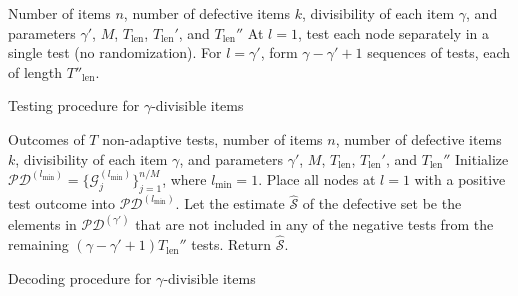 \begin{algorithm}[!t]
    \begin{algorithmic}[1]
        \REQUIRE Number of items $n$, number of defective items $k$, divisibility of each item $\gamma$, and parameters $\gamma'$, $M$, $T_{\text{len}}$, $T_{\text{len}}'$, and $T_{\text{len}}''$
        \STATE At $l=1$, test each node separately in a single test (no randomization).
        \ENDFOR
        \STATE For $l=\gamma'$, form $\gamma-\gamma'+1$ sequences of tests, each of length $T''_{\text{len}}$.
        \ENDFOR
    \end{algorithmic}
    \caption{Testing procedure for $\gamma$-divisible items \label{alg:gamma_nonadap_testing}}
\end{algorithm}

\begin{algorithm}[!t]
    \begin{algorithmic}[1]
        \REQUIRE Outcomes of $T$ non-adaptive tests, number of items $n$, number of defective items $k$, divisibility of each item $\gamma$, and parameters $\gamma'$, $M$, $T_{\text{len}}$, $T_{\text{len}}'$, and $T_{\text{len}}''$
        \STATE Initialize $\mathcal{PD}^{(l_{\text{min}})}=\big\{\mathcal{G}_j^{(l_{\text{min}})}\big\}_{j=1}^{n/M}$, where $l_{\text{min}}=1$.
        \STATE Place all nodes at $l=1$ with a positive test outcome into $\mathcal{PD}^{(l_{\text{min}})}$.
        \ENDFOR
        \STATE Let the estimate $\widehat{\mathcal{S}}$ of the defective set be the elements in $\mathcal{PD}^{(\gamma')}$ that are not included in any of the negative tests from the remaining $(\gamma-\gamma'+1)T_{\text{len}}''$ tests.
        \STATE Return $\widehat{\mathcal{S}}$.
    \end{algorithmic}
    \caption{Decoding procedure for $\gamma$-divisible items \label{alg:gamma_nonadap_decoding}}
\end{algorithm}

